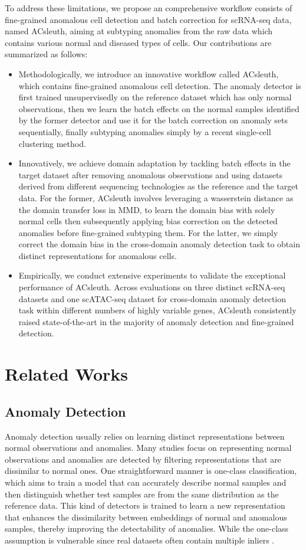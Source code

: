 \documentclass{article}
\begin{document}
To address these limitations, we propose an comprehensive workflow consists of fine-grained anomalous cell 
detection and batch correction for scRNA-seq data, named ACsleuth, aiming at 
subtyping anomalies from the raw data which contains various normal and diseased types of 
cells. Our contributions are summarized as follows:
\begin{itemize}

\item Methodologically, we introduce an innovative workflow called ACsleuth, which contains 
fine-grained anomalous cell detection. The anomaly detector is first trained 
unsupervisedly on the reference dataset which has only normal observations, then we learn 
the batch effects on the normal samples identified by the former detector and use it for 
the batch correction on anomaly sets sequentially, finally subtyping anomalies simply by a recent 
single-cell clustering method.
\item Innovatively, we achieve domain adaptation by tackling batch effects in the target dataset 
after removing anomalous observations and using datasets derived from different sequencing technologies 
as the reference and the target data. For the former, ACsleuth involves leveraging a wasserstein 
distance as the domain transfer loss in MMD, to learn the domain bias with solely normal cells 
then subsequently applying bias correction on the detected anomalies before fine-grained subtyping them. 
For the latter, we simply correct the domain bias in the cross-domain anomaly detection task to obtain 
distinct representations for anomalous cells.
\item Empirically, we conduct extensive experiments to validate the exceptional performance 
of ACsleuth. Across evaluations on three distinct scRNA-seq datasets and one scATAC-seq dataset 
for cross-domain anomaly detection task within different numbers of highly variable genes, 
ACsleuth consistently raised state-of-the-art in the majority of anomaly detection and 
fine-grained detection.
\end{itemize}
\section{Related Works}
\subsection{Anomaly Detection}
Anomaly detection usually relies on learning distinct representations between normal 
observations and anomalies. Many studies focus on representing normal observations and 
anomalies are detected by filtering representations that are dissimilar to normal ones. 
One straightforward manner is one-class classification, which aims to train a model that 
can accurately describe normal samples and then distinguish whether test samples are from 
the same distribution as the reference data. This kind of detectors is trained to learn a 
new representation \cite{RCA} \cite {liznerski} that 
enhances the dissimilarity between embeddings of normal and anomalous samples, thereby 
improving the detectability of anomalies. While the one-class assumption is vulnerable 
since real datasets often contain multiple inliers \cite{SLAD}.
\end{document}
